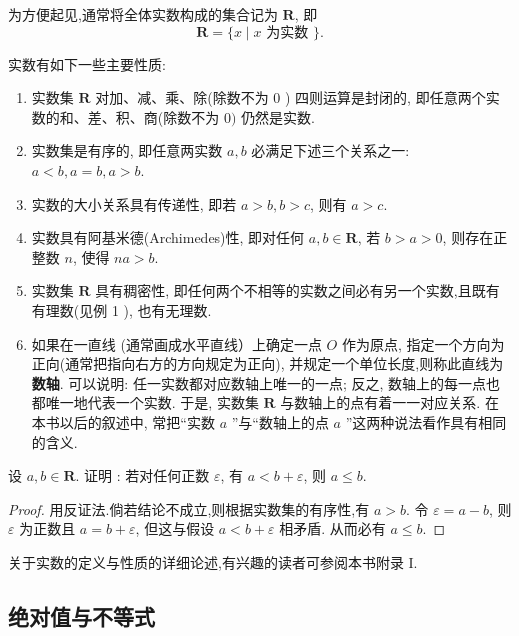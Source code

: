 为方便起见,通常将全体实数构成的集合记为 $\mathbf{R}$, 即
\[
\mathbf{R}=\{x \mid x \text { 为实数 }\} .
\]

实数有如下一些主要性质:

\begin{enumerate}
	\item 实数集 $\mathbf{R}$ 对加、减、乘、除(除数不为 0 ) 四则运算是封闭的, 即任意两个实数的和、差、积、商(除数不为 0$)$ 仍然是实数.

	\item 实数集是有序的, 即任意两实数 $a, b$ 必满足下述三个关系之一: $a<b, a=b, a>b$.

	\item 实数的大小关系具有传递性, 即若 $a>b, b>c$, 则有 $a>c$.

	\item 实数具有阿基米德(Archimedes)性, 即对任何 $a, b \in \mathbf{R}$, 若 $b>a>0$, 则存在正整数 $n$, 使得 $n a>b$.

	\item 实数集 $\mathbf{R}$ 具有稠密性, 即任何两个不相等的实数之间必有另一个实数,且既有 有理数(见例 1 ), 也有无理数.

	\item 如果在一直线 (通常画成水平直线）上确定一点 $O$ 作为原点, 指定一个方向为正向(通常把指向右方的方向规定为正向), 并规定一个单位长度,则称此直线为\textbf{数轴}. 可以说明: 任一实数都对应数轴上唯一的一点; 反之, 数轴上的每一点也都唯一地代表一个实数. 于是, 实数集 $\mathbf{R}$ 与数轴上的点有着一一对应关系. 在本书以后的叙述中, 常把“实数 $a$ ”与“数轴上的点 $a$ ”这两种说法看作具有相同的含义.
\end{enumerate}

\begin{example}
	设 $a, b \in \mathbf{R}$. 证明 : 若对任何正数 $\varepsilon$, 有 $a<b+\varepsilon$, 则 $a \leqslant b$.
\end{example}

\begin{proof}
	用反证法.倘若结论不成立,则根据实数集的有序性,有 $a>b$. 令 $\varepsilon=a-b$, 则 $\varepsilon$ 为正数且 $a=b+\varepsilon$, 但这与假设 $a<b+\varepsilon$ 相矛盾. 从而必有 $a \leqslant b$.
\end{proof}


关于实数的定义与性质的详细论述,有兴趣的读者可参阅本书附录 I.

\subsection{绝对值与不等式}

